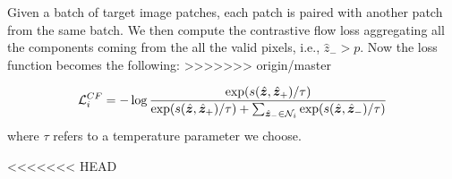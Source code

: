 Given a batch of target image patches, each patch is paired with another patch from the same batch. We then compute the contrastive flow loss aggregating all the components coming from the all the valid pixels, i.e.,  $\hat{z}_- > p$. 
Now the loss function becomes the following:
>>>>>>> origin/master

\begin{equation}
    \small
    \mathcal{L}_i^{CF} = - \log \frac{\exp( s (\hat{\bm{ z}}, \hat{\bm{ z}}_+)/\tau )}{ \exp( s (\hat{\bm{ z}}, \hat{\bm{ z}}_+)/\tau ) + \sum_{\hat{\bm{ z}}_- \in \mathcal{N}_i} \exp( s (\hat{\bm{ z}}, \hat{\bm{ z}}_-)/\tau ) }\\
    \label{eq-contrastive-flow-loss}
  \end{equation}
where $\tau$ refers to a temperature parameter we choose. 

<<<<<<< HEAD



